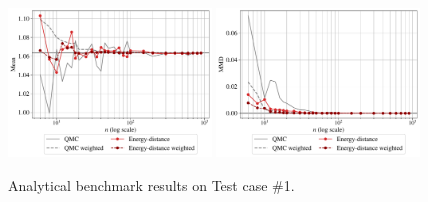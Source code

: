 \begin{figure}[!h]
\begin{center}
    \includegraphics[width=0.48\textwidth]{part2/figures/DCE/analytical_bench/Gaussian_Mixture_convergence_ED.pdf}
    \includegraphics[width=0.48\textwidth]{part2/figures/DCE/analytical_bench/Gaussian_Mixture_convergence_MMD_ED.pdf}\\
\end{center}
\caption{Analytical benchmark results on Test case \#1.} \label{fig:test case1}
\end{figure}

